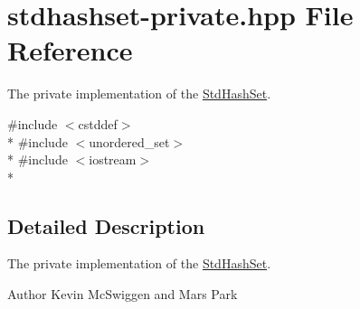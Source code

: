 \hypertarget{stdhashset-private_8hpp}{\section{stdhashset-\/private.hpp File Reference}
\label{stdhashset-private_8hpp}
}


The private implementation of the \hyperlink{class_std_hash_set}{Std\-Hash\-Set}.  


{\ttfamily \#include $<$cstddef$>$}\\*
{\ttfamily \#include $<$unordered\-\_\-set$>$}\\*
{\ttfamily \#include $<$iostream$>$}\\*


\subsection{Detailed Description}
The private implementation of the \hyperlink{class_std_hash_set}{Std\-Hash\-Set}. \begin{DoxyAuthor}{Author}
Kevin Mc\-Swiggen and Mars Park 
\end{DoxyAuthor}
